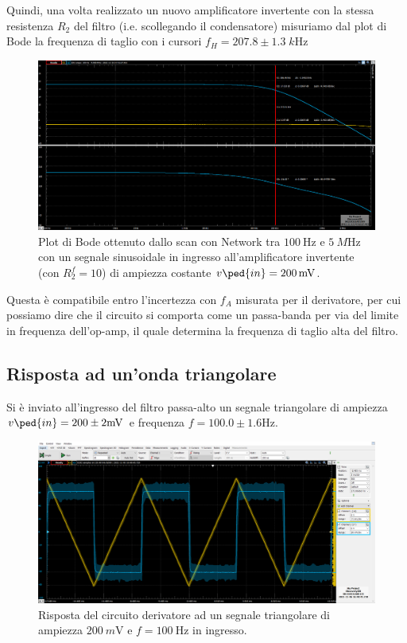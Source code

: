 \documentclass[10pt,a4paper]{article}
\begin{document}
Quindi, una volta realizzato un nuovo amplificatore invertente con la
stessa resistenza $R_2$ del filtro (i.e. scollegando il condensatore)
misuriamo dal plot di Bode la frequenza di taglio con i cursori
$f_H = 207.8 \pm 1.3 \; \si{k\Hz}$
\begin{figure}[htbp]
\centering
\includegraphics[scale=0.36]{ampinv10}
\caption{Plot di Bode ottenuto dallo scan con Network tra $\SI{100}{\Hz}$ e
$\SI{5}{M\Hz}$ con un segnale sinusoidale in ingresso all'amplificatore
invertente (con $R_2^f=10$) di ampiezza costante $v\ped{in} = \SI{200}{m\V}$.
\label{fig: ampinv10}}
\end{figure}

Questa è compatibile entro l'incertezza con $f_A$ misurata per il derivatore,
per cui possiamo dire che il circuito si comporta come un passa-banda per via
del limite in frequenza dell'op-amp, il quale determina la frequenza di taglio
alta del filtro.

\subsection{Risposta ad un'onda triangolare}
Si è inviato all'ingresso del filtro passa-alto un segnale triangolare di
ampiezza $v\ped{in} = 200 \pm 2 \si{m\V}$ e frequenza
$f = 100.0 \pm 1.6 \si{\Hz}$.

\begin{figure}[htbp]
\centering
\includegraphics[scale=0.4]{derivatore}
\caption{Risposta del circuito derivatore ad un segnale triangolare di ampiezza
$\SI{200}{m\V}$ e $f = \SI{100}{\Hz}$ in ingresso. \label{fig: dertrg}}
\end{figure}
\end{document}
